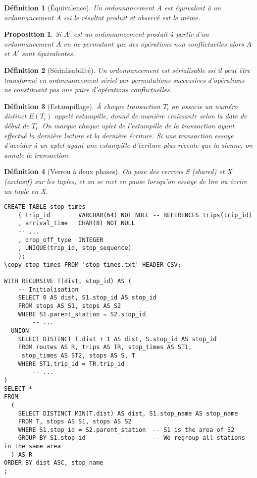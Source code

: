 \documentclass[landscape]{article}
\newcommand{\1}{\mathbbm{1}}
\newcommand{\0}{\mathbbm{0}}
\newtheorem{prop}{Proposition}
\newtheorem{defi}{Définition}
\begin{document}
\begin{multicols}{2}
    \begin{defi}[Équivalence] Un ordonnancement $A$ est équivalent à un ordonnancement
        $A$ ssi le résultat produit et observé est le même.
    \end{defi}

    \begin{prop} Si $A'$ est un ordonnancement produit à partir d'un ordonnancement $A$
        en ne permutant que des opérations non conflictuelles alors $A$ et $A'$
        sont équivalentes.
    \end{prop}

    \begin{defi}[Sérialisabilité]
        Un ordonnancement est sérialisable ssi il peut être transformé en ordonnancement
        sériel par permutations successives d'opérations ne constituant pas une
        paire d'opérations conflictuelles.
    \end{defi}

    \begin{defi}[Estampillage]
        À chaque transaction $T_i$ on associe un numéro distinct $E(T_i)$ appelé
        estampille, donné de manière croissante selon la date de début de $T_i$.
        On marque chaque uplet de l'estampille de la transaction ayant effectué
        la dernière lecture et la dernière écriture. Si une transaction essaye
        d'accéder à un uplet ayant une estampille d'écriture plus récente que
        la sienne, on annule la transaction.
    \end{defi}

    \begin{defi}[Verrou à deux phases]
        On pose des verrous S (shared) et X (exclusif) sur les tuples, et on
        se met en pause lorsqu'on essaye de lire ou écrire un tuple en X.
    \end{defi}

    \begin{lstlisting}
CREATE TABLE stop_times
    ( trip_id        VARCHAR(64) NOT NULL -- REFERENCES trips(trip_id)
    , arrival_time   CHAR(8) NOT NULL
    -- ...
    , drop_off_type  INTEGER
    , UNIQUE(trip_id, stop_sequence)
    );
\copy stop_times FROM 'stop_times.txt' HEADER CSV;

WITH RECURSIVE T(dist, stop_id) AS (
    -- Initialisation
    SELECT 0 AS dist, S1.stop_id AS stop_id
    FROM stops AS S1, stops AS S2
    WHERE S1.parent_station = S2.stop_id
        -- ...
  UNION
    SELECT DISTINCT T.dist + 1 AS dist, S.stop_id AS stop_id
    FROM routes AS R, trips AS TR, stop_times AS ST1,
	 stop_times AS ST2, stops AS S, T
    WHERE ST1.trip_id = TR.trip_id
        -- ...
)
SELECT *
FROM
  (
    SELECT DISTINCT MIN(T.dist) AS dist, S1.stop_name AS stop_name
    FROM T, stops AS S1, stops AS S2
    WHERE S1.stop_id = S2.parent_station  -- S1 is the area of S2
    GROUP BY S1.stop_id                   -- We regroup all stations in the same area
  ) AS R
ORDER BY dist ASC, stop_name
;

    \end{lstlisting}

\end{multicols}
\end{document}
